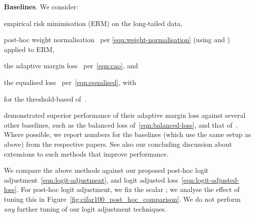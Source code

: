 \textbf{Baselines}.
We consider:
\begin{enumerate*}[label=(\roman*)]
    \item empirical risk minimisation (ERM) on the long-tailed data,

    \item post-hoc weight normalisation~\citep{Kang:2020}
per \eqref{eqn:weight-normalisation} (using  and ) 
applied to ERM,

    \item the adaptive margin loss~\citep{Cao:2019}
    per~\eqref{eqn:cao},
    and

    \item the equalised loss~\citep{Tan:2020}
    per~\eqref{eqn:equalised},
    with 

    for the threshold-based  of~\citet{Tan:2020}.
\end{enumerate*}
\citet{Cao:2019} demonstrated superior performance of their adaptive margin loss against several other baselines,
such as the balanced loss of~\eqref{eqn:balanced-loss},
and that of~\citet{Cui:2019}.
Where possible, we report numbers for the baselines 
(which use the same setup as above)
from the respective papers.
See also our concluding discussion about extensions to such methods that improve performance.

We compare the above methods against
our proposed post-hoc logit adjustment~\eqref{eqn:logit-adjustment},
and logit adjusted loss~\eqref{eqn:logit-adjusted-loss}.
For post-hoc logit adjustment, we fix the scalar ;
we analyse the effect of tuning this in Figure~\ref{fig:cifar100_post_hoc_comparison}.
We do not perform \emph{any} further tuning of our logit adjustment techniques.

